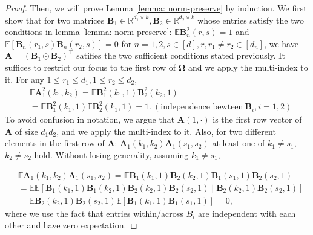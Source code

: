 \begin{proof}
Then, we will prove Lemma \ref{lemma: norm-preserve} by induction. 
We first show that for two matrices $\mathbf{B}_1 \in \mathbb{R}^{d_1\times k}, \mathbf{B}_2 \in \mathbb{R}^{d_2\times k}$ whose entries satisfy the two conditions in lemma \ref{lemma: norm-preserve}: $\mathbb{E} \mathbf{B}^2_{n}(r,s)=1$
and  $\mathbb{E} [ \mathbf{B}_{n}(r_1,s)\mathbf{B}_{n}(r_2,s)] =0$ for $n=1,2, s\in [d], r, r_1\neq r_2\in [d_n]$, we have $\mathbf{A} = (\mathbf{B}_1 \odot\mathbf{B}_2 )^\top $ satifies the two sufficient conditions stated previously. It suffices to restrict our focus to the first row of $\mathbf{\Omega}$ and we apply the multi-index to it. For any $1\le r_1\le d_1, 1\le r_2\le d_2$, 
\begin{equation}
\begin{aligned}
&\mathbb{E}  \mathbf{A}^2_{1}(k_1,k_2) = \mathbb{E} \mathbf{B}^2_{1}(k_1,1)\mathbf{B}^2_{2}(k_2,1)\\
& =  \mathbb{E} \mathbf{B}^2_{1}(k_1,1) \mathbb{E} \mathbf{B}^2_{2}(k_1,1) = 1.  ~(\text{independence bewteen} ~ \mathbf{B}_i, i=1,2 )
\nonumber
\end{aligned}
\end{equation}
To avoid confusion in notation, we argue that $ \mathbf{A}(1,\cdot)$ is the first row vector of $ \mathbf{A}$ of size $d_1d_2$, and we apply the multi-index to it.  Also, for two different elements in the first row of $\mathbf{A}$: $ \mathbf{A}_{1}(k_1,k_2) \mathbf{A}_{1}(s_1,s_2)$ at least one of $k_1\neq s_1$, $k_2\neq s_2$ hold. Without losing generality, assuming $k_1\neq s_1$, 

\begin{equation}
\begin{aligned}
&\mathbb{E}  \mathbf{A}_{1}(k_1,k_2) \mathbf{A}_{1}(s_1,s_2)  = \mathbb{E} \mathbf{B}_{1}(k_1,1)\mathbf{B}_{2}(k_2,1)\mathbf{B}_{1}(s_1,1)\mathbf{B}_{2}(s_2,1)\\
& =  \mathbb{E} \mathbb{E}\left[ \mathbf{B}_{1}(k_1,1)\mathbf{B}_{1}(k_2,1)\mathbf{B}_{2}(k_2,1)\mathbf{B}_{2}(s_2,1)  \mid  \mathbf{B}_{2}(k_2,1)\mathbf{B}_{2}(s_2,1)\right]\\
& =  \mathbb{E}  \mathbf{B}_{2}(k_2,1)\mathbf{B}_{2}(s_2,1) \mathbb{E}\left[ \mathbf{B}_{1}(k_1,1)\mathbf{B}_{1}(s_1,1) \right]  = 0,
\nonumber
\end{aligned}
\end{equation}
where we use the fact that entries within/across $B_i$ are independent with each other and have zero expectation. \par 


\end{proof}
